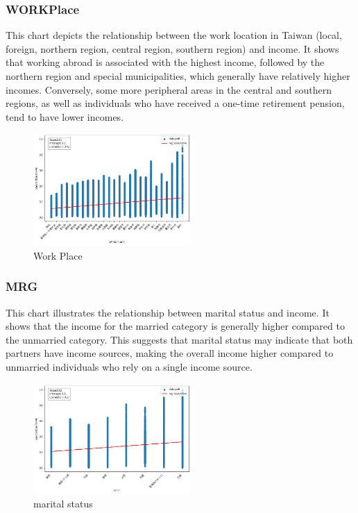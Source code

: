 \documentclass[twocolumn]{article}
\begin{document}
		\subsubsection{WORKPlace}
This chart depicts the relationship between the work location in Taiwan (local, foreign, northern region, central region, southern region) and income. It shows that working abroad is associated with the highest income, followed by the northern region and special municipalities, which generally have relatively higher incomes. Conversely, some more peripheral areas in the central and southern regions, as well as individuals who have received a one-time retirement pension, tend to have lower incomes.
		\begin{figure}[H]
		\centering
		\includegraphics[width=6cm]{WORKPLACE.png} 
		\caption{Work Place} 
		\label{Fig.WORKPLACE} 
		\end{figure}

		\subsubsection{MRG}
This chart illustrates the relationship between marital status and income. It shows that the income for the married category is generally higher compared to the unmarried category. This suggests that marital status may indicate that both partners have income sources, making the overall income higher compared to unmarried individuals who rely on a single income source.
		\begin{figure}[H]
		\centering
		\includegraphics[width=6cm]{MRG.png} 
		\caption{marital status} 
		\label{Fig.MRG} 
		\end{figure}
\end{document}
